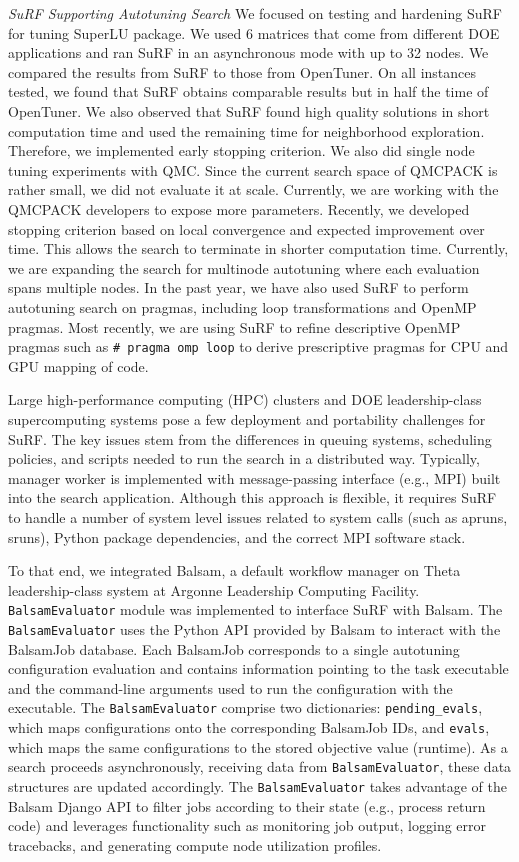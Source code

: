 \vspace*{.1in}
\noindent
\textit{SuRF Supporting Autotuning Search}
We focused on testing and hardening SuRF for tuning SuperLU package. We used 6 matrices that come from different DOE applications and ran SuRF in an asynchronous mode with up to 32 nodes. We compared the results from SuRF to those from OpenTuner. On all instances tested, we found that SuRF obtains comparable results but in half the time of OpenTuner. We also observed that SuRF found high quality solutions in short computation time and used the remaining time for neighborhood exploration. Therefore, we implemented early stopping criterion. We also did single node tuning experiments with QMC. Since the current search space of QMCPACK is rather small, we did not evaluate it at scale. Currently, we are working with the QMCPACK developers to expose more parameters.
Recently, we developed stopping criterion based on local convergence and expected improvement over time. This allows the search to terminate in shorter computation time. Currently, we are expanding the search for multinode autotuning where each evaluation spans multiple nodes.
In the past year, we have also used SuRF to perform autotuning search on
pragmas, including loop transformations and OpenMP pragmas. Most recently,
we are using SuRF to refine descriptive OpenMP pragmas such as \texttt{\# pragma omp loop} to derive prescriptive pragmas for CPU and GPU mapping of code.


Large high-performance computing (HPC) clusters and DOE leadership-class supercomputing systems pose a few deployment and portability challenges for SuRF. The key issues stem from the differences in queuing systems, scheduling policies, and scripts needed to run the search in a distributed way. Typically, manager worker is implemented with message-passing interface (e.g., MPI) built into the search application. Although this approach is flexible, it requires SuRF to handle a number of system level issues related to system calls (such as apruns, sruns), Python package dependencies, and the correct MPI software stack.

To that end, we integrated Balsam, a default workflow manager on Theta leadership-class system at Argonne Leadership Computing Facility. \texttt{BalsamEvaluator} module was implemented to interface SuRF with Balsam. The \texttt{BalsamEvaluator} uses the Python API provided by Balsam to interact with the BalsamJob database. Each BalsamJob corresponds to a single autotuning configuration evaluation and contains information pointing to the task executable and the command-line arguments used to run the configuration with the executable. The \texttt{BalsamEvaluator} comprise two dictionaries: \texttt{pending\_evals}, which maps configurations onto the corresponding BalsamJob IDs, and \texttt{evals}, which maps the same configurations to the stored objective value (runtime). As a search proceeds asynchronously, receiving data from \texttt{BalsamEvaluator}, these data structures are updated accordingly. The \texttt{BalsamEvaluator} takes advantage of the Balsam Django API to filter jobs according to their state (e.g., process return code) and leverages functionality such as monitoring job output, logging error tracebacks, and generating compute node utilization profiles.

